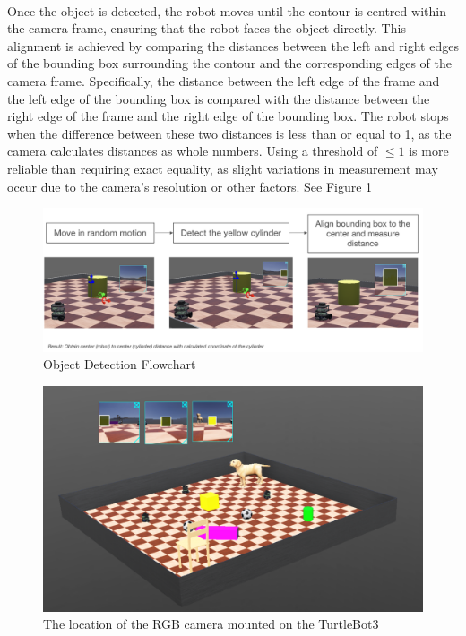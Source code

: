 \paragraph*{}
Once the object is detected, the robot moves until the contour is centred within the camera frame, ensuring that the robot faces the object directly. This alignment is achieved by comparing the distances between the left and right edges of the bounding box surrounding the contour and the corresponding edges of the camera frame. Specifically, the distance between the left edge of the frame and the left edge of the bounding box is compared with the distance between the right edge of the frame and the right edge of the bounding box. The robot stops when the difference between these two distances is less than or equal to 1, as the camera calculates distances as whole numbers. Using a threshold of \(\leq 1\) is more reliable than requiring exact equality, as slight variations in measurement may occur due to the camera's resolution or other factors. See Figure \ref{fig:obj-flow}

\begin{figure}
    \centering
    \includegraphics[width=0.8\linewidth]{assets/images/object_detection/obj-flow.png}
    \caption{Object Detection Flowchart}
    \label{fig:obj-flow}
\end{figure}

\begin{figure}[H]
    \centering
    \includegraphics[width=1.0\linewidth]{assets/images/object_detection/fig2.png}
    \caption{The location of the RGB camera mounted on the TurtleBot3}
    \label{fig:object detection figure 2} 
\end{figure}

